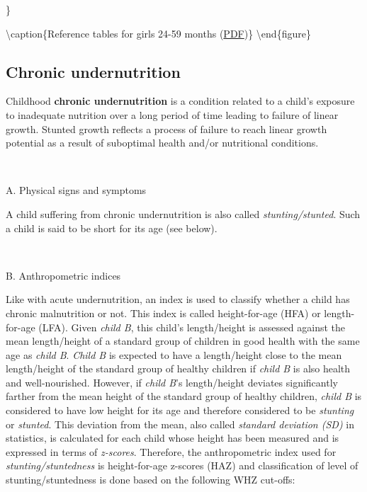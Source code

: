 \documentclass[12pt,]{book}
\theoremstyle{definition}
\theoremstyle{definition}
\theoremstyle{definition}
\theoremstyle{remark}
\begin{document}
\}

\textbackslash{}caption\{Reference tables for girls 24-59 months
(\href{'pdf/girls_24_60.pdf'}{PDF})\}\label{fig:anthro14}
\textbackslash{}end\{figure\}

\hypertarget{chronic-undernutrition}{%
\subsection{Chronic undernutrition}\label{chronic-undernutrition}}

Childhood \textbf{chronic undernutrition} is a condition related to a
child's exposure to inadequate nutrition over a long period of time
leading to failure of linear growth. Stunted growth reflects a process
of failure to reach linear growth potential as a result of suboptimal
health and/or nutritional conditions.

~

A. Physical signs and symptoms

A child suffering from chronic undernutrition is also called
\emph{stunting/stunted}. Such a child is said to be short for its age
(see below).

~

B. Anthropometric indices

Like with acute undernutrition, an index is used to classify whether a
child has chronic malnutrition or not. This index is called
height-for-age (HFA) or length-for-age (LFA). Given \emph{child B}, this
child's length/height is assessed against the mean length/height of a
standard group of children in good health with the same age as
\emph{child B}. \emph{Child B} is expected to have a length/height close
to the mean length/height of the standard group of healthy children if
\emph{child B} is also health and well-nourished. However, if
\emph{child B}'s length/height deviates significantly farther from the
mean height of the standard group of healthy children, \emph{child B} is
considered to have low height for its age and therefore considered to be
\emph{stunting} or \emph{stunted}. This deviation from the mean, also
called \emph{standard deviation (SD)} in statistics, is calculated for
each child whose height has been measured and is expressed in terms of
\emph{z-scores}. Therefore, the anthropometric index used for
\emph{stunting/stuntedness} is height-for-age z-scores (HAZ) and
classification of level of stunting/stuntedness is done based on the
following WHZ cut-offs:

~
\end{document}
